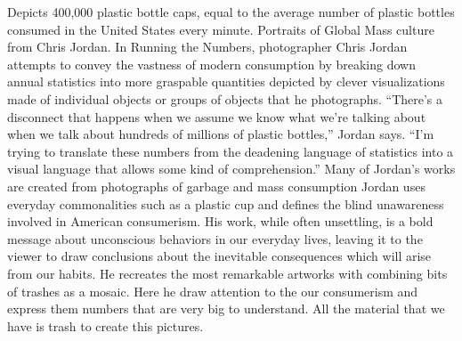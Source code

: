 Depicts 400,000 plastic bottle caps, equal to the average number of plastic bottles consumed in the United States every minute. Portraits of Global Mass culture from Chris Jordan. In Running the Numbers, photographer Chris Jordan attempts to convey the vastness of modern consumption by breaking down annual statistics into more graspable quantities depicted by clever visualizations made of individual objects or groups of objects that he photographs. “There’s a disconnect that happens when we assume we know what we’re talking about when we talk about hundreds of millions of plastic bottles,” Jordan says. “I’m trying to translate these numbers from the deadening language of statistics into a visual language that allows some kind of comprehension.” Many of Jordan's works are created from photographs of garbage and mass consumption Jordan uses everyday commonalities such as a plastic cup and defines the blind unawareness involved in American consumerism. His work, while often unsettling, is a bold message about unconscious behaviors in our everyday lives, leaving it to the viewer to draw conclusions about the inevitable consequences which will arise from our habits. He recreates the most remarkable artworks with combining bits of trashes as a mosaic. Here he draw attention to the our consumerism and express them numbers that are very big to understand. All the material that we have is trash to create this pictures.






